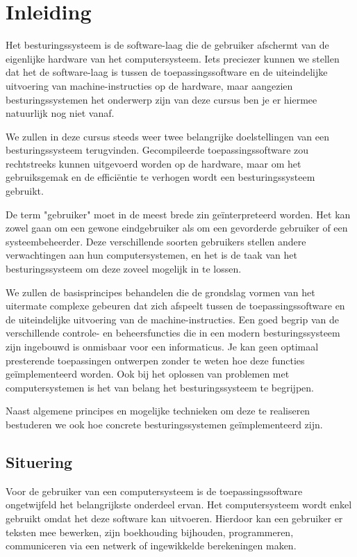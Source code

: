 \chapter{Inleiding}

Het besturingssysteem is de software-laag die de gebruiker afschermt
van de eigenlijke hardware van het computersysteem. Iets preciezer kunnen
we stellen dat het de software-laag is tussen de toepassingssoftware en de
uiteindelijke uitvoering van machine-instructies op de hardware, maar
aangezien besturingssystemen het onderwerp zijn van deze cursus ben je er
hiermee natuurlijk nog niet vanaf.

We zullen in deze cursus steeds weer twee belangrijke doelstellingen
van een besturingssysteem terugvinden. Gecompileerde toepassingssoftware
zou rechtstreeks kunnen uitgevoerd worden op de hardware, maar om het
gebruiksgemak en de effici\"entie te verhogen wordt een besturingssysteem
gebruikt.

De term "gebruiker" moet in de meest brede zin
ge\"interpreteerd worden. Het kan zowel gaan om een gewone eindgebruiker als
om een gevorderde gebruiker of een systeembeheerder. Deze verschillende
soorten gebruikers stellen andere verwachtingen aan hun computersystemen,
en het is de taak van het besturingssysteem om deze zoveel mogelijk in te
lossen.

We zullen de basisprincipes behandelen die de grondslag vormen van
het uitermate complexe gebeuren dat zich afspeelt tussen de
toepassingssoftware en de uiteindelijke uitvoering van de
machine-instructies. Een goed begrip van de verschillende controle- en
beheersfuncties die in een modern besturingssysteem zijn ingebouwd is
onmisbaar voor een informaticus. Je kan geen optimaal presterende
toepassingen ontwerpen zonder te weten hoe deze functies ge\"implementeerd
worden. Ook bij het oplossen van problemen met computersystemen is het van
belang het besturingssysteem te begrijpen.

Naast algemene principes en mogelijke technieken om deze te
realiseren bestuderen we ook hoe concrete besturingssystemen
ge\"implementeerd zijn.

\section{Situering}

Voor de gebruiker van een computersysteem is de
toepassingssoftware ongetwijfeld het belangrijkste onderdeel ervan. Het
computersysteem wordt enkel gebruikt omdat het deze software kan
uitvoeren. Hierdoor kan een gebruiker er teksten mee bewerken, zijn
boekhouding bijhouden, programmeren, communiceren via een netwerk of
ingewikkelde berekeningen maken.


